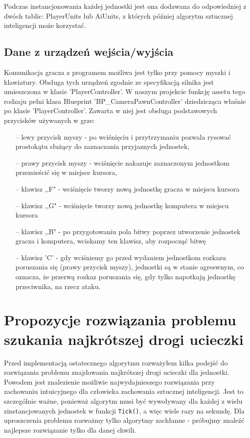 \documentclass[12pt]{report}
\begin{document}
Podczas instancjonowania każdej jednostki jest ona dodawana do odpowiedniej z dwóch tablic: PlayerUnits lub AiUnits, z których później algorytm sztucznej inteligencji może korzystać.

\subsection{Dane z urządzeń wejścia/wyjścia}
Komunikacja gracza z programem możliwa jest tylko przy pomocy myszki i klawiatury. Obsługa tych urządzeń zgodnie ze specyfikacją silnika jest umieszczona w klasie 'PlayerController'. W naszym projekcie funkcję assetu tego rodzaju pełni klasa Blueprint 'BP\_CameraPawnController' dziedzicząca właśnie po klasie 'PlayerController'. Zawarta w niej jest obsługa podstawowych przycisków używanych w grze: 

\begin{itemize}
\item[--] lewy przycisk myszy - po wciśnięciu i przytrzymaniu pozwala rysować prostokątu służący do zaznaczania przyjaznych jednostek,
\item[--] prawy przycisk myszy - wciśnięcie nakazuje zaznaczonym jednostkom przemieścić się w miejsce kursora,
\item[--] klawisz ,,F" - wciśnięcie tworzy nową jednostkę gracza w miejscu kursora
\item[--] klawisz ,,G" - wciśnięcie tworzy nową jednostkę komputera w miejscu kursora
\item[--] klawisz ,,B" - po przygotowaniu pola bitwy poprzez utworzenie jednostek gracza i komputera, wciskamy ten klawisz, aby rozpocząć bitwę
\item[--] klawisz 'C' - gdy wciśniemy go przed wydaniem jednostkom rozkazu poruszania się (prawy przycisk myszy), jednostki są w stanie agreswnym, co oznacza, że przerwą rozkaz poruszania się, gdy tylko napotkają jednostkę przeciwnika, na rzecz ataku.
\end{itemize}
\section{Propozycje rozwiązania problemu szukania najkrótszej drogi ucieczki}

Przed implementacją ostatecznego algorytmu rozważyłem kilka podejść do rozwiązania problemu znajdowania najkrótszej drogi ucieczki dla jednostki. Powodem jest znalezienie możliwie najwydajnieszego rozwiązania przy zachowaniu intuicyjnego dla człowieka zachowania sztucznej inteligencji. Jest to szczególnie ważne, ponieważ algorytm musi być wywoływany dla każdej z wielu zinstancjowanych jednostek w funkcji \texttt{\texttt{Tick}()}, a więc wiele razy na sekundę. Dla uproszczenia problemu rozważmy tylko algorytmy zachłanne - próbujmy znaleźć najlepsze rozwiązanie tylko dla danej chwili.
\end{document}
